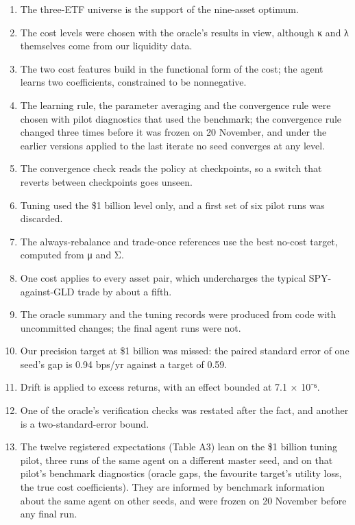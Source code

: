 \documentclass[
  11pt]{article}
\providecommand{\tightlist}{%
  \setlength{\itemsep}{0pt}\setlength{\parskip}{0pt}}
\begin{document}
\begin{enumerate}
\def\labelenumi{\arabic{enumi}.}
\tightlist
\item
  The three-ETF universe is the support of the nine-asset optimum.
\item
  The cost levels were chosen with the oracle's results in view,
  although κ and λ themselves come from our liquidity data.
\item
  The two cost features build in the functional form of the cost; the
  agent learns two coefficients, constrained to be nonnegative.
\item
  The learning rule, the parameter averaging and the convergence rule
  were chosen with pilot diagnostics that used the benchmark; the
  convergence rule changed three times before it was frozen on 20
  November, and under the earlier versions applied to the last iterate
  no seed converges at any level.
\item
  The convergence check reads the policy at checkpoints, so a switch
  that reverts between checkpoints goes unseen.
\item
  Tuning used the \$1 billion level only, and a first set of six pilot
  runs was discarded.
\item
  The always-rebalance and trade-once references use the best no-cost
  target, computed from μ and Σ.
\item
  One cost applies to every asset pair, which undercharges the typical
  SPY-against-GLD trade by about a fifth.
\item
  The oracle summary and the tuning records were produced from code with
  uncommitted changes; the final agent runs were not.
\item
  Our precision target at \$1 billion was missed: the paired standard
  error of one seed's gap is 0.94 bps/yr against a target of 0.59.
\item
  Drift is applied to excess returns, with an effect bounded at 7.1 ×
  10⁻⁶.
\item
  One of the oracle's verification checks was restated after the fact,
  and another is a two-standard-error bound.
\item
  The twelve registered expectations (Table A3) lean on the \$1 billion
  tuning pilot, three runs of the same agent on a different master seed,
  and on that pilot's benchmark diagnostics (oracle gaps, the favourite
  target's utility loss, the true cost coefficients). They are informed
  by benchmark information about the same agent on other seeds, and were
  frozen on 20 November before any final run.
\end{enumerate}
\end{document}
